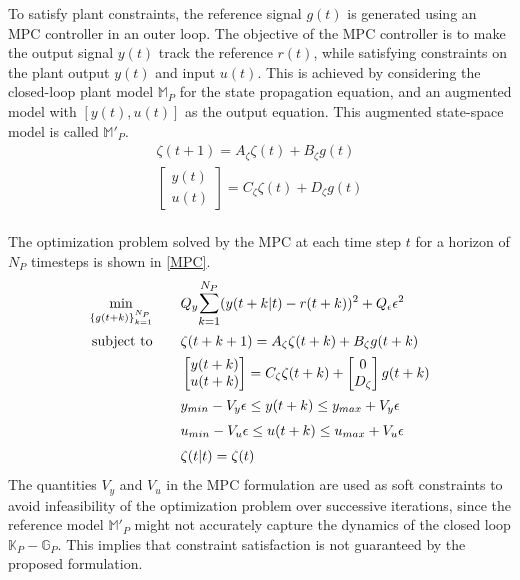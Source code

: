 \documentclass[letterpaper, 10 pt, conference]{ieeeconf}  %
\begin{document}
	To satisfy plant constraints, the reference signal $g(t)$ is generated using an MPC controller in an outer loop. The objective of the MPC controller is to make the output signal $y(t)$ track the reference $r(t)$, while satisfying constraints on the plant output $y(t)$ and input $u(t)$. This is achieved by considering the closed-loop plant model $\mathbb{M}_P$ for the state propagation equation, and an augmented model with $[y(t),u(t)]$ as the output equation. This augmented state-space model is called $\mathbb{M}'_P$.
	\begin{equation*}
	\begin{matrix}
	\zeta(t+1) = A_\zeta\zeta(t) + B_\zeta g(t)\\
	\begin{bmatrix}y(t)\\u(t)\end{bmatrix} = C_\zeta\zeta(t) + D_\zeta g(t)
	\end{matrix}
	\end{equation*}
	\\
	The optimization problem solved by the MPC at each time step $t$ for a horizon of $N_P$ timesteps is shown in \eqref{MPC}.
	\begin{equation}
	\begin{aligned}
	 \underset{\{g(t+k)\}_{k=1}^{N_P}}{\text{min}}
	& \hspace{20pt} Q_y\mathlarger{\sum\limits_{k=1}^{N_P}}(y(t+k|t)-r(t+k))^2 + Q_{\epsilon}\epsilon^2 \\
	 \text{subject to}
	&   \hspace{20pt}
	\zeta(t+k+1) = A_\zeta\zeta(t+k) + B_\zeta g(t+k)\\
	& \hspace{20pt} \begin{bmatrix}y(t+k)\\u(t+k)\end{bmatrix} = C_\zeta\zeta(t+k) +  \begin{bmatrix}0\\D_\zeta\end{bmatrix}g(t+k)\\
	& \hspace{20pt}  y_{min}-V_y\epsilon \leq y(t+k) \leq  y_{max}+V_y\epsilon \\
	& \hspace{20pt}  u_{min}-V_u\epsilon \leq u(t+k) \leq u_{max}+V_u\epsilon \\
	& \hspace{20pt}  \zeta(t|t) = \zeta(t)
	\end{aligned}
	\label{MPC}
	\end{equation}
	The quantities $V_y$ and $V_u$ in the MPC formulation are used as soft constraints to avoid infeasibility of the optimization problem over successive iterations, since the reference model $\mathbb{M}'_P$ might not accurately capture the dynamics of the closed loop $\mathbb{K}_P-\mathbb{G}_P$. This implies that constraint satisfaction is not guaranteed by the proposed formulation. 
	
\end{document}
